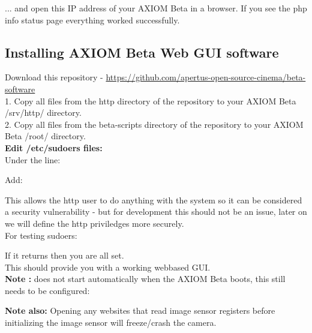 ... and open this IP address of your AXIOM Beta in a browser. If you see the php info status page everything worked successfully.     






\subsection{Installing AXIOM Beta Web GUI software}

Download this repository - \href{https://github.com/apertus-open-source-cinema/beta-software}{https://github.com/apertus-open-source-cinema/beta-software}\\

1. Copy all files from the http directory of the repository to your AXIOM Beta /srv/http/ directory.\\
2. Copy all files from the beta-scripts directory of the repository to your AXIOM Beta /root/ directory.\\ 

\textbf{Edit /etc/sudoers files:}\\

Under the line: 


Add:


This allows the http user to do anything with the system so it can be considered a security vulnerability - but for development this should not be an issue, later on we will define the http priviledges more securely.\\

For testing sudoers: 


If it returns  then you are all set.\\

This should provide you with a working webbased GUI.\\

\textbf{Note :}  does not start automatically when the AXIOM Beta boots, this still needs to be configured: 


\textbf{Note also:} Opening any websites that read image sensor registers before initializing the image sensor  will freeze/crash the camera. 








